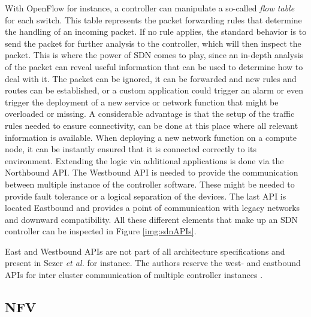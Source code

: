 With OpenFlow for instance, a controller can manipulate a so-called \textit{flow table} for each switch. This table represents the packet forwarding rules that determine the handling of an incoming packet. If no rule applies, the standard behavior is to send the packet for further analysis to the controller, which will then inspect the packet. This is where the power of SDN comes to play, since an in-depth analysis of the packet can reveal useful information that can be used to determine how to deal with it. The packet can be ignored, it can be forwarded and new rules and routes can be established, or a custom application could trigger an alarm or even trigger the deployment of a new service or network function that might be overloaded or missing. A considerable advantage is that the setup of the traffic rules needed to ensure connectivity, can be done at this place where all relevant information is available. When deploying a new network function on a compute node, it can be instantly ensured that it is connected correctly to its environment. Extending the logic via additional applications is done via the Northbound API. The Westbound API is needed to provide the communication between multiple instance of the controller software. These might be needed to provide fault tolerance or a logical separation of the devices. The last API is located Eastbound and provides a point of communication with legacy networks and downward compatibility. All these different elements that make up an SDN controller can be inspected in Figure \ref{img:sdnAPIs}.

East and Westbound APIs are not part of all architecture specifications and present in Sezer \textit{et al.} \cite{sezer2013we} for instance. The authors reserve the west- and eastbound APIs for inter cluster communication of multiple controller instances \cite{nunes2014survey} \cite{jarschel2014interfaces} \cite{sezer2013we} \cite{hu2014survey} \cite{shin2012software} \cite{jammal2014software}.

\subsection{NFV}

